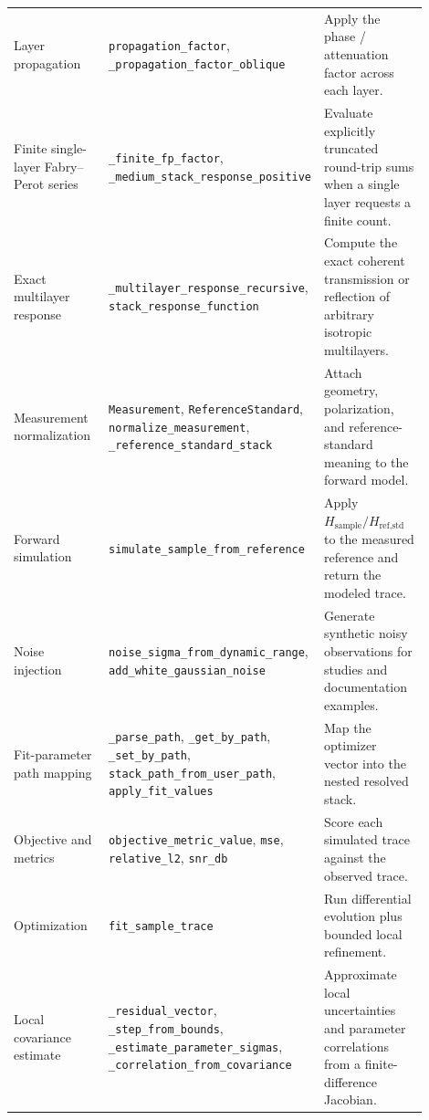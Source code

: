 \documentclass[11pt]{article}
\begin{document}
\begin{longtable}{p{0.30\linewidth} p{0.25\linewidth} p{0.35\linewidth}}
Layer propagation &
\texttt{propagation\_factor}, \texttt{\_propagation\_factor\_oblique} &
Apply the phase / attenuation factor across each layer. \\

Finite single-layer Fabry--Perot series &
\texttt{\_finite\_fp\_factor}, \texttt{\_medium\_stack\_response\_positive} &
Evaluate explicitly truncated round-trip sums when a single layer requests a finite count. \\

Exact multilayer response &
\texttt{\_multilayer\_response\_recursive}, \texttt{stack\_response\_function} &
Compute the exact coherent transmission or reflection of arbitrary isotropic multilayers. \\

Measurement normalization &
\texttt{Measurement}, \texttt{ReferenceStandard}, \texttt{normalize\_measurement}, \texttt{\_reference\_standard\_stack} &
Attach geometry, polarization, and reference-standard meaning to the forward model. \\

Forward simulation &
\texttt{simulate\_sample\_from\_reference} &
Apply $H_{\text{sample}}/H_{\text{ref,std}}$ to the measured reference and return the modeled trace. \\

Noise injection &
\texttt{noise\_sigma\_from\_dynamic\_range}, \texttt{add\_white\_gaussian\_noise} &
Generate synthetic noisy observations for studies and documentation examples. \\

Fit-parameter path mapping &
\texttt{\_parse\_path}, \texttt{\_get\_by\_path}, \texttt{\_set\_by\_path}, \texttt{stack\_path\_from\_user\_path}, \texttt{apply\_fit\_values} &
Map the optimizer vector into the nested resolved stack. \\

Objective and metrics &
\texttt{objective\_metric\_value}, \texttt{mse}, \texttt{relative\_l2}, \texttt{snr\_db} &
Score each simulated trace against the observed trace. \\

Optimization &
\texttt{fit\_sample\_trace} &
Run differential evolution plus bounded local refinement. \\

Local covariance estimate &
\texttt{\_residual\_vector}, \texttt{\_step\_from\_bounds}, \texttt{\_estimate\_parameter\_sigmas}, \texttt{\_correlation\_from\_covariance} &
Approximate local uncertainties and parameter correlations from a finite-difference Jacobian. \\
\bottomrule
\end{longtable}
\end{document}
